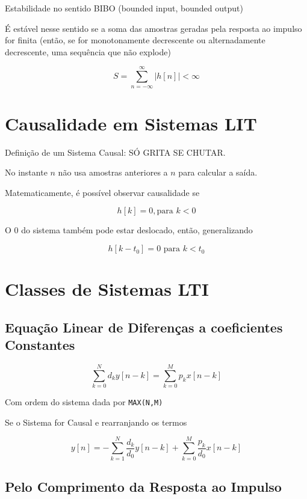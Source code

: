 Estabilidade no sentido BIBO (bounded input, bounded output)

É estável nesse sentido se a soma das amostras geradas pela resposta ao impulso for finita (então, se for monotonamente decrescente ou alternadamente decrescente, uma sequência que não explode)

\[S = \sum_{n = -\infty}^{\infty} |h[n]| < \infty  \]
\section{Causalidade em Sistemas LIT}

Definição de um Sistema Causal: SÓ GRITA SE CHUTAR.

No instante $n$ não usa amostras anteriores a $n$ para calcular a saída.

Matematicamente, é possível observar causalidade se 

\[h[k] = 0, \text{para } k < 0\]

O $0$ do sistema também pode estar deslocado, então, generalizando

\[h[k - t_{0}] = 0 \text{ para } k < t_{0}\]

\section{Classes de Sistemas LTI}

\subsection{Equação Linear de Diferenças a coeficientes Constantes}

\[\sum_{k = 0}^{N}d_{k} y[n - k] = \sum_{k = 0}^{M}p_{k}x[n - k]\]

Com ordem do sistema dada por \texttt{MAX(N,M)}

Se o Sistema for Causal e rearranjando os termos

\[y[n] = -\sum_{k = 1}^{N}\dfrac{d_{k}}{d_{0}} y[n - k] + \sum_{k = 0}^{M}\dfrac{p_{k}}{d_{0}}x[n - k]\]

\subsection{Pelo Comprimento da Resposta ao Impulso}

